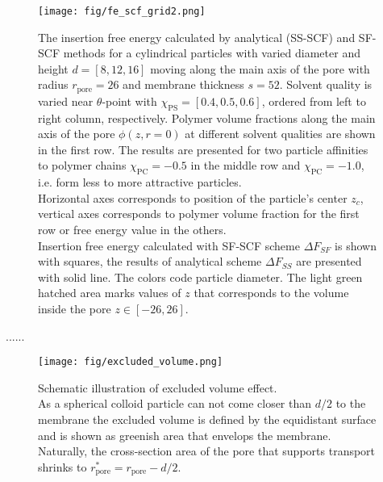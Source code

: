 \documentclass[12pt, a4paper]{article}
\begin{document}
\begin{figure}
    \centering
    \texttt{[image: fig/fe\_scf\_grid2.png]}
    \caption{ 
    The insertion free energy calculated by analytical (SS-SCF) and SF-SCF methods for a cylindrical particles with varied diameter and height $d=[8, 12, 16]$ moving along the main axis of the pore with radius $r_{\textrm{pore}} = 26$ and membrane thickness $s=52$.
    Solvent quality is varied near $\theta$-point with $\chi_{\textrm{PS}} = [0.4, 0.5, 0.6]$, ordered from left to right column, respectively.
    Polymer volume fractions along the main axis of the pore $\phi(z,r=0)$ at different solvent qualities are shown in the first row.
    The results are presented for two particle affinities to polymer chains $\chi_{\textrm{PC}} = -0.5$ in the middle row and $\chi_{\textrm{PC}} = -1.0$, i.e. form less to more attractive particles.
    \\
    Horizontal axes corresponds to position of the particle's center $z_c$, vertical axes corresponds to polymer volume fraction for the first row or free energy value in the others.
    \\
    Insertion free energy calculated with SF-SCF scheme $\Delta F_{SF}$ is shown with squares, the results of analytical scheme $\Delta F_{SS}$ are presented with solid line. 
    The colors code particle diameter.
    The light green hatched area marks values of $z$ that corresponds to the volume inside the pore $z\in [-26, 26]$.
    \label{fig:fe_scf_grid}
    }
\end{figure}

......
\begin{figure}
    \centering
    \texttt{[image: fig/excluded\_volume.png]}
    \caption{
        Schematic illustration of excluded volume effect.
        \\
        As a spherical colloid particle can not come closer than $d/2$ to the membrane the excluded volume is defined by the equidistant surface and is shown as greenish area that envelops the membrane.
        Naturally, the cross-section area of the pore that supports transport shrinks to $r_{\textrm{pore}}^{\ast} = r_{\textrm{pore}} - d/2$.
    }
    \label{fig:excluded_volume}
\end{figure}
\end{document}
